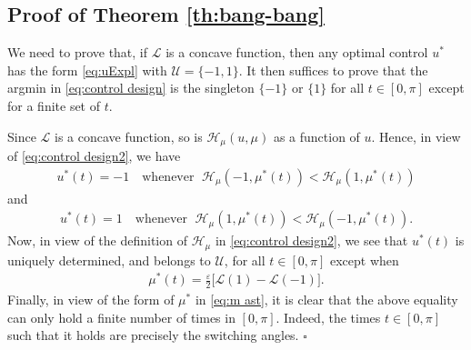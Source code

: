 \documentclass[twocolumn]{autart}    %
\begin{document}
\subsection{Proof of Theorem \ref{th:bang-bang}}\label{proof:bang-bang}

We need to prove that, if $\mathcal{L}$ is a concave function, then any optimal control $u^\ast$ has the form \eqref{eq:uExpl} with $\mathcal{U}=\{-1,1\}$. It then suffices to prove that the argmin in \eqref{eq:control design} is the singleton $\{-1\}$ or $\{1\}$ for all $t\in [0,\pi]$ except for a finite set of $t$.

Since $\mathcal{L}$ is a concave function, so is $\mathcal{H}_\mu(u,\mu)$ as a function of $u$. Hence, in view of \eqref{eq:control design2}, we have
\begin{align*} 
	u^\ast (t)= -1  \quad \text{whenever } \; \mathcal{H}_\mu(-1,\mu^\ast(t)) <  \mathcal{H}_\mu(1,\mu^\ast(t)) 
\end{align*} 
and
\begin{align*}
	u^\ast (t)= 1  \quad \text{whenever } \; \mathcal{H}_\mu(1,\mu^\ast(t)) <  \mathcal{H}_\mu(-1,\mu^\ast(t)) .
\end{align*}
Now, in view of the definition of $\mathcal{H}_\mu$ in \eqref{eq:control design2}, we see that $u^\ast(t)$ is uniquely determined, and belongs to $\mathcal{U}$, for all $t\in [0,\pi]$ except when
\begin{align*}
	\mu^\ast (t) = \frac{\varepsilon}{2} \Big[\mathcal{L}(1) - \mathcal{L}(-1)\Big].
\end{align*}
Finally, in view of the form of $\mu^\ast$ in \eqref{eq:m ast}, it is clear that the above equality can only hold a finite number of times in $[0,\pi]$. Indeed, the times $t\in [0,\pi]$ such that it holds are precisely the switching angles. \hfill $\square$
\end{document}

